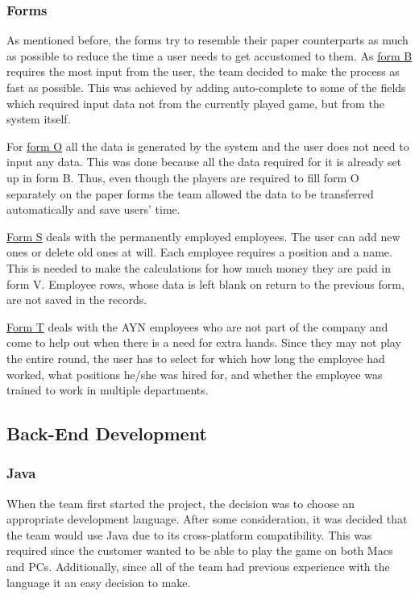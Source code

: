 \documentclass{l3proj}
\begin{document}
\subsubsection{Forms}
As mentioned before, the forms try to resemble their paper counterparts as much as possible to reduce the time a user needs to get accustomed to them. As \hyperref[fig:FormB]{form B} requires the most input from the user, the team decided to make the process as fast as possible. This was achieved by adding auto-complete to some of the fields which required input data not from the currently played game, but from the system itself.

For \hyperref[fig:FormO]{form O}  all the data is generated by the system and the user does not need to input any data. This was done because all the data required for it is already set up in form B. Thus, even though the players are required to fill form O separately on the paper forms the team allowed the data to be transferred automatically and save users' time.

\hyperref[fig:FormS]{Form S}  deals with the permanently employed employees. The user can add new ones or delete old ones at will. Each employee requires a position and a name. This is needed to make the calculations for how much money they are paid in form V. Employee rows, whose data is left blank on return to the previous form, are not saved in the records.

\hyperref[fig:FormT]{Form T} deals with the AYN employees who are not part of the company and come to help out when there is a need for extra hands. Since they may not play the entire round, the user has to select for which how long the employee had worked, what positions he/she was hired for, and whether the employee was trained to work in multiple departments.

\subsection{Back-End Development}
\subsubsection{Java}
When the team first started the project, the decision was to choose an appropriate development language. After some consideration, it was decided that the team would use Java due to its cross-platform compatibility. This was required since the customer wanted to be able to play the game on both Macs and PCs. Additionally, since all of the team had previous experience with the language it an easy decision to make.
\end{document}
